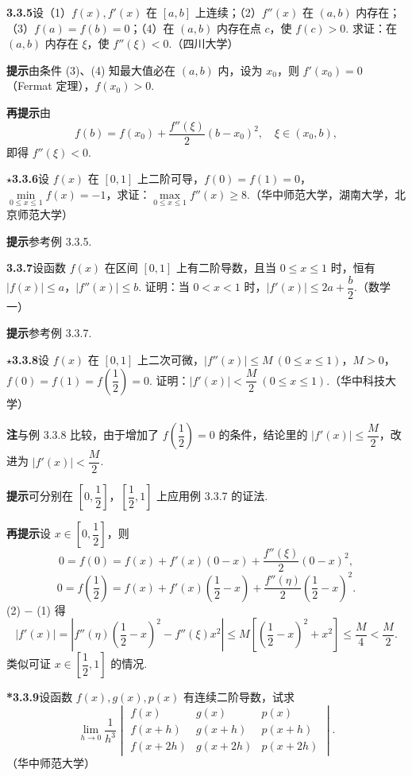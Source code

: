 \documentclass[UTF8,12pt,a4paper,fontset=fandol]{ctexart}
\begin{document}
\noindent\textbf{3.3.5}\quad 设（1）$f(x),f'(x)$ 在 $[a,b]$ 上连续；（2）$f''(x)$ 在 $(a,b)$ 内存在；（3）$f(a)=f(b)=0$；（4）在 $(a,b)$ 内存在点 $c$，使 $f(c)>0$. 求证：在 $(a,b)$ 内存在 $\xi$，使 $f''(\xi)<0$.（四川大学）

\noindent\textbf{提示}\quad 由条件 (3)、(4) 知最大值必在 $(a,b)$ 内，设为 $x_0$，则 $f'(x_0)=0$（Fermat 定理），$f(x_0)>0$.

\noindent\textbf{再提示}\quad 由
\[
  f(b)=f(x_0)+\frac{f''(\xi)}2(b-x_0)^2,\quad \xi\in(x_0,b),
\]
即得 $f''(\xi)<0$.

\noindent\textbf{$\star$3.3.6}\quad 设 $f(x)$ 在 $[0,1]$ 上二阶可导，$f(0)=f(1)=0$，$\min\limits_{0\le x\le1}f(x)=-1$，求证：$\max\limits_{0\le x\le1}f''(x)\ge8$.（华中师范大学，湖南大学，北京师范大学）

\noindent\textbf{提示}\quad 参考例 3.3.5.

\noindent\textbf{3.3.7}\quad 设函数 $f(x)$ 在区间 $[0,1]$ 上有二阶导数，且当 $0\le x\le1$ 时，恒有 $|f(x)|\le a$，$|f''(x)|\le b$. 证明：当 $0<x<1$ 时，$|f'(x)|\le2a+\dfrac b2$.（数学一）

\noindent\textbf{提示}\quad 参考例 3.3.7.

\noindent\textbf{$\star$3.3.8}\quad 设 $f(x)$ 在 $[0,1]$ 上二次可微，$|f''(x)|\le M\ (0\le x\le1)$，$M>0$，$f(0)=f(1)=f\left(\dfrac12\right)=0$. 证明：$|f'(x)|<\dfrac M2\ (0\le x\le1)$.（华中科技大学）

\noindent\textbf{注}\quad 与例 3.3.8 比较，由于增加了 $f\left(\dfrac12\right)=0$ 的条件，结论里的 $|f'(x)|\le\dfrac M2$，改进为 $|f'(x)|<\dfrac M2$.

\noindent\textbf{提示}\quad 可分别在 $\left[0,\dfrac12\right]$，$\left[\dfrac12,1\right]$ 上应用例 3.3.7 的证法.

\noindent\textbf{再提示}\quad 设 $x\in\left[0,\dfrac12\right]$，则
\[
  0=f(0)=f(x)+f'(x)(0-x)+\frac{f''(\xi)}2(0-x)^2, \tag{1}
\]
\[
  0=f\left(\frac12\right)=f(x)+f'(x)\left(\frac12-x\right)
  +\frac{f''(\eta)}2\left(\frac12-x\right)^2. \tag{2}
\]
(2) $-$ (1) 得
\[
  |f'(x)|=\left|f''(\eta)\left(\frac12-x\right)^2-f''(\xi)x^2\right|
  \le M\left[\left(\frac12-x\right)^2+x^2\right]\le\frac M4<\frac M2.
\]
类似可证 $x\in\left[\dfrac12,1\right]$ 的情况.

\noindent\textbf{*3.3.9}\quad 设函数 $f(x),g(x),p(x)$ 有连续二阶导数，试求
\[
  \lim_{h\to0}\frac1{h^3}
  \begin{vmatrix}
  f(x)&g(x)&p(x)\\
  f(x+h)&g(x+h)&p(x+h)\\
  f(x+2h)&g(x+2h)&p(x+2h)
  \end{vmatrix}.
\]
（华中师范大学）
\end{document}
